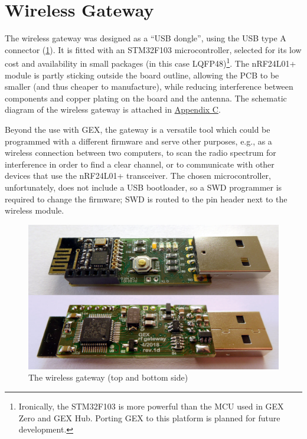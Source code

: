 \section{Wireless Gateway} \label{sec:rfgateway}

The wireless gateway was designed as a ``\gls{USB} dongle'', using the \gls{USB} type A connector (\cref{fig:gwxgw}). It is fitted with an STM32F103 microcontroller, selected for its low cost and availability in small packages (in this case LQFP48)\footnote{ Ironically, the STM32F103 is more powerful than the \gls{MCU} used in GEX Zero and GEX Hub. Porting GEX to this platform is planned for future development.}. The nRF24L01+ module is partly sticking outside the board outline, allowing the \gls{PCB} to be smaller (and thus cheaper to manufacture), while reducing interference between components and copper plating on the board and the antenna. The schematic diagram of the wireless gateway is attached in \hyperref[apx:gex_wgw]{Appendix C}.

Beyond the use with GEX, the gateway is a versatile tool which could be programmed with a different firmware and serve other purposes, e.g., as a wireless connection between two computers, to scan the radio spectrum for interference in order to find a clear channel, or to communicate with other devices that use the nRF24L01+ transceiver. The chosen microcontroller, unfortunately, does not include a USB bootloader, so a SWD programmer is required to change the firmware; SWD is routed to the pin header next to the wireless module.


\begin{figure}[h]
	\centering
	\includegraphics[width=.9\textwidth]{img/photo-rfdongle.jpg}
	\caption{\label{fig:gwxgw}The wireless gateway (top and bottom side)}
\end{figure}
